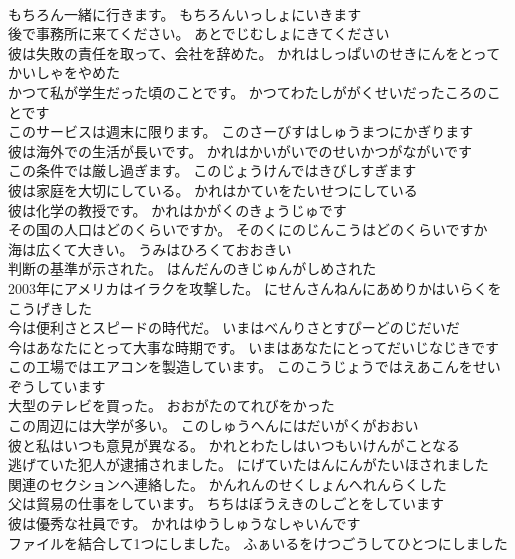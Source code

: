 \documentclass[8pt]{extreport}
\begin{document}
\begin{CJK}{UTF8}{min}
\\	もちろん一緒に行きます。	もちろんいっしょにいきます 
\\	後で事務所に来てください。	あとでじむしょにきてください 
\\	彼は失敗の責任を取って、会社を辞めた。	かれはしっぱいのせきにんをとってかいしゃをやめた 
\\	かつて私が学生だった頃のことです。	かつてわたしががくせいだったころのことです 
\\	このサービスは週末に限ります。	このさーびすはしゅうまつにかぎります 
\\	彼は海外での生活が長いです。	かれはかいがいでのせいかつがながいです 
\\	この条件では厳し過ぎます。	このじょうけんではきびしすぎます 
\\	彼は家庭を大切にしている。	かれはかていをたいせつにしている 
\\	彼は化学の教授です。	かれはかがくのきょうじゅです 
\\	その国の人口はどのくらいですか。	そのくにのじんこうはどのくらいですか 
\\	海は広くて大きい。	うみはひろくておおきい 
\\	判断の基準が示された。	はんだんのきじゅんがしめされた 
\\	2003年にアメリカはイラクを攻撃した。	にせんさんねんにあめりかはいらくをこうげきした 
\\	今は便利さとスピードの時代だ。	いまはべんりさとすぴーどのじだいだ 
\\	今はあなたにとって大事な時期です。	いまはあなたにとってだいじなじきです 
\\	この工場ではエアコンを製造しています。	このこうじょうではえあこんをせいぞうしています 
\\	大型のテレビを買った。	おおがたのてれびをかった 
\\	この周辺には大学が多い。	このしゅうへんにはだいがくがおおい 
\\	彼と私はいつも意見が異なる。	かれとわたしはいつもいけんがことなる 
\\	逃げていた犯人が逮捕されました。	にげていたはんにんがたいほされました 
\\	関連のセクションへ連絡した。	かんれんのせくしょんへれんらくした 
\\	父は貿易の仕事をしています。	ちちはぼうえきのしごとをしています 
\\	彼は優秀な社員です。	かれはゆうしゅうなしゃいんです 
\\	ファイルを結合して1つにしました。	ふぁいるをけつごうしてひとつにしました 

\end{CJK}
\end{document}
